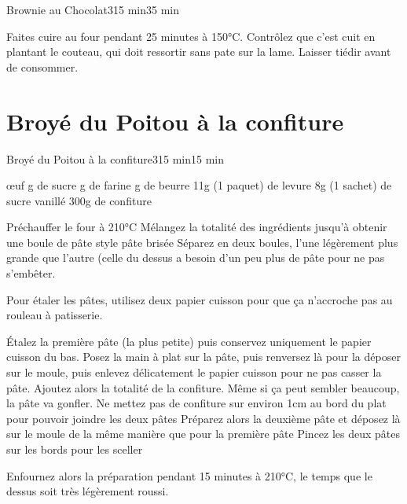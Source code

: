 {\begin{recette}{Brownie au Chocolat}{3}{15 min}{35 min}
\begin{cuisson}
Faites cuire au four pendant 25 minutes à 150°C. Contrôlez 
que c'est cuit en plantant le couteau, qui doit ressortir sans pate sur la lame.
Laisser tiédir avant de consommer. 
\end{cuisson}
\end{recette}

\section{Broyé du Poitou à la confiture}
\begin{recette}{Broyé du Poitou à la confiture}{3}{15 min}{15 min}
\begin{ingredients}
 œuf
 g de sucre
 g de farine
 g de beurre
\ingredient 11g (1 paquet) de levure
\ingredient 8g (1 sachet) de sucre vanillé
\ingredient 300g de confiture
\end{ingredients}

\begin{preparation}
\etape Préchauffer le four à 210°C
\etape Mélangez la totalité des ingrédients jusqu'à obtenir une boule de pâte style pâte brisée
\etape Séparez en deux boules, l'une légèrement plus grande que l'autre (celle du dessus a besoin d'un peu plus de pâte pour ne 
pas s'embêter.
\begin{remarque}
Pour étaler les pâtes, utilisez deux papier cuisson pour que ça n'accroche pas au rouleau à patisserie.\end{remarque}
\etape  Étalez la première pâte (la plus petite) puis conservez uniquement le papier cuisson du bas. Posez la main à plat sur la pâte, puis renversez là pour la déposer sur le moule, puis enlevez délicatement le papier cuisson pour ne pas casser la pâte.
\etape Ajoutez alors la totalité de la confiture. Même si ça peut sembler beaucoup, la pâte va gonfler. Ne mettez pas de confiture sur environ 1cm au bord du plat pour pouvoir joindre les deux pâtes
\etape Préparez alors la deuxième pâte et déposez là sur le moule de la même manière que pour la première pâte
\etape Pincez les deux pâtes sur les bords pour les sceller

\end{preparation}

\begin{cuisson}
Enfournez alors la préparation pendant 15 minutes à 210°C, le temps que le dessus soit très légèrement roussi.
\end{cuisson}
\end{recette}

}
